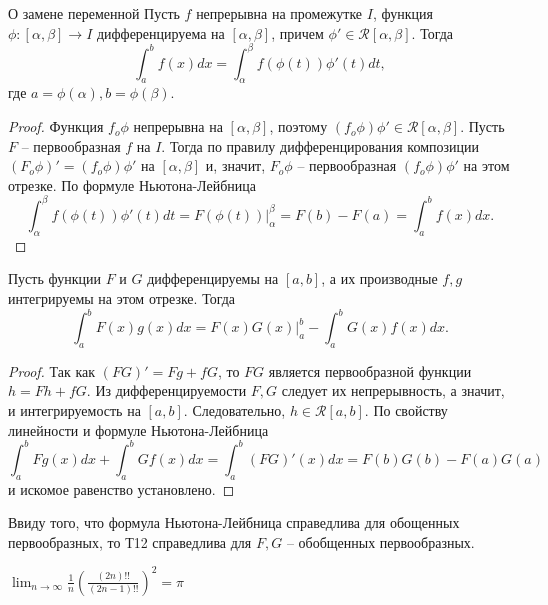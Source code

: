 \begin{theorem}
    {О замене переменной}
    Пусть $f$ непрерывна на промежутке $I$, функция $\phi: [\alpha, \beta] \to I$ дифференцируема на $[\alpha, \beta]$, причем $\phi' \in \mathcal{R}[\alpha, \beta]$. Тогда
    \[\int_{a}^{b}f(x)dx = \int_{\alpha}^{\beta}f(\phi(t))\phi'(t)dt,\]
    где $a = \phi(\alpha), b = \phi(\beta).$
\end{theorem}

\begin{proof}
    Функция $f_{o}\phi$ непрерывна на $[\alpha, \beta]$, поэтому $(f_{o}\phi)\phi' \in \mathcal{R}[\alpha, \beta]$. Пусть $F$ -- первообразная $f$ на $I$. Тогда по правилу дифференцирования композиции $(F_{o}\phi)' = (f_{o}\phi)\phi'$ на $[\alpha, \beta]$ и, значит, $F_{o}\phi$ -- первообразная $(f_{o}\phi)\phi'$ на этом отрезке. По формуле Ньютона-Лейбница
    \[\int_{\alpha}^{\beta}f(\phi(t))\phi'(t)dt = F(\phi(t))|_{\alpha}^{\beta} = F(b) - F(a) = \int_{a}^{b}f(x)dx.\]
\end{proof}

\begin{theorem}
    Пусть функции $F$ и $G$ дифференцируемы на $[a, b]$, а их производные $f, g$ интегрируемы на этом отрезке. Тогда
    \[\int_{a}^{b}F(x)g(x)dx = F(x)G(x)|_{a}^{b} - \int_{a}^{b}G(x)f(x)dx.\]
\end{theorem}

\begin{proof}
    Так как $(FG)' = Fg + fG$, то $FG$ является первообразной функции $h = Fh + fG$. Из дифференцируемости $F, G$ следует их непрерывность, а значит, и интегрируемость на $[a, b]$. Следовательно, $h \in \mathcal{R}[a, b]$. По свойству линейности и формуле Ньютона-Лейбница
    \[\int_{a}^{b}Fg(x)dx + \int_{a}^{b}Gf(x)dx = \int_{a}^{b}(FG)'(x)dx = F(b)G(b) - F(a)G(a)\]
    и искомое равенство установлено.
\end{proof}

\begin{note}
    Ввиду того, что формула Ньютона-Лейбница справедлива для обощенных первообразных, то Т12 справедлива для $F, G$ -- обобщенных первообразных.
\end{note}

\begin{problem}
    $\lim_{n \to \infty} \frac{1}{n}(\frac{(2n)!!}{(2n-1)!!})^{2} = \pi$
\end{problem}

